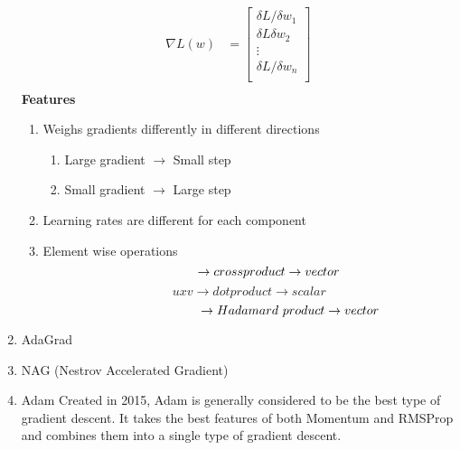 \begin{enumerate}
    \begin{align*}
    \nabla L(w) &= \begin{bmatrix}
           \delta L/\delta w_1    \\
           \delta L\delta w_2    \\
           \vdots   \\
           \delta L/\delta w_n    \\
         \end{bmatrix} \\
    \end{align*}
    \newline \textbf{Features}
    \begin{enumerate}
        \item Weighs gradients differently in different directions
        \begin{enumerate}
            \item Large gradient $\rightarrow$ Small step
            \item Small gradient $\rightarrow$ Large step
        \end{enumerate}
        \item Learning rates are different for each component
        \item Element wise operations
        \[
        \hspace{1.1cm} \rightarrow cross product \rightarrow vector
        \]
        \[
        uxv \rightarrow dot product \rightarrow scalar
        \]
        \[
        \hspace{2.3cm} \rightarrow Hadamard\ product \rightarrow vector
        \]
    \end{enumerate}
    \item AdaGrad
    \item NAG (Nestrov Accelerated Gradient)
    \item Adam
    \newline Created in 2015, Adam is generally considered to be the best type of gradient descent. It takes the best features of both Momentum and RMSProp and combines them into a single type of gradient descent.
\end{enumerate}
